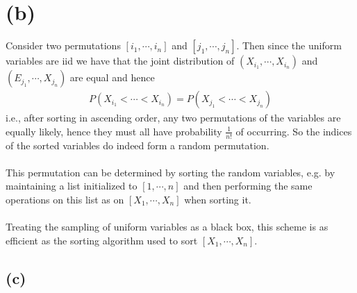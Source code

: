 \section*{(b)}
Consider two permutations $\left[ i_1,\cdots,i_n \right]$ and $\left[ j_1,\cdots,j_n \right]$.
Then since the uniform variables are iid we have that the joint distribution of
$\left( X_{i_1},\cdots, X_{i_n} \right)$ and
$\left( E_{j_1},\cdots,X_{j_n} \right)$
are equal and hence
\begin{align*}
	P\left( X_{i_1}<\cdots<X_{i_n} \right)=P\left( X_{j_1}<\cdots<X_{j_n} \right)
\end{align*}
i.e., after sorting in ascending order, any two permutations of the variables are equally likely, 
hence they must all have probability $\frac{1}{n!}$ of occurring. 
So the indices of the sorted variables do indeed form a random permutation. \\ \\
This permutation can be determined by sorting the random variables, 
e.g. by maintaining a list initialized to $\left[ 1,\cdots,n \right]$ 
and then performing the same operations on this list as on $\left[ X_1,\cdots,X_n \right]$ 
when sorting it. \\ \\
Treating the sampling of uniform variables as a black box,
this scheme is as efficient as the sorting algorithm used to sort $\left[ X_1,\cdots,X_n \right]$.
\subsection*{(c)}
